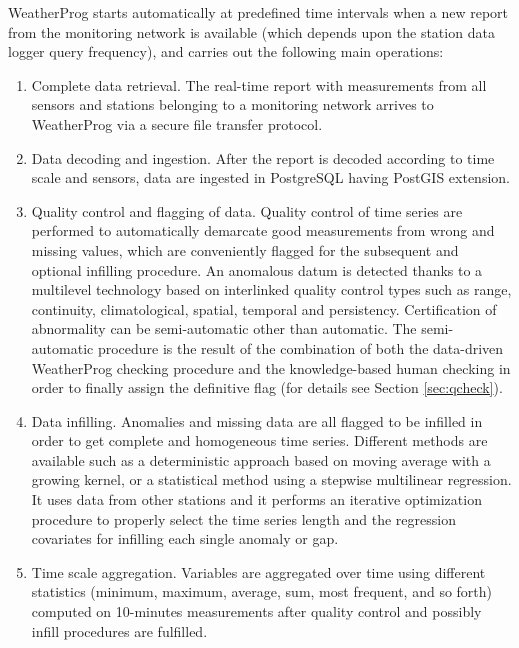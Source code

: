 \documentclass[authoryear,preprint,review,12pt]{elsarticle}
\begin{document}
WeatherProg starts automatically at predefined time intervals when a new report from the monitoring network is available (which depends upon the station data logger query frequency), and carries out the following main operations:
\begin{enumerate}
    \item Complete data retrieval. The real-time report with measurements from all sensors and stations belonging to a monitoring network arrives to WeatherProg via a secure file transfer protocol.
    
    \item Data decoding and ingestion. After the report is decoded according to time scale and sensors, data are ingested in PostgreSQL having PostGIS extension.

    \item Quality control and flagging of data. Quality control of time series are performed to automatically demarcate good measurements from wrong and missing values, which are conveniently flagged for the subsequent and optional infilling procedure.
    An anomalous datum is detected thanks to a multilevel technology based on interlinked quality control types such as range, continuity, climatological, spatial, temporal and persistency.
    Certification of abnormality can be semi-automatic other than automatic.
    The semi-automatic procedure is the result of the combination of both the data-driven WeatherProg checking procedure and the knowledge-based human checking in order to finally assign the definitive flag (for details see Section \ref{sec:qcheck}).
    
    \item Data infilling. Anomalies and missing data are all flagged to be %
    infilled in order to get complete and homogeneous time series.
    Different methods are available such as a deterministic approach based on moving average with a growing kernel, or a statistical method using a stepwise multilinear regression.
    It uses data from other stations and it performs an iterative optimization procedure to properly select the time series length and the regression covariates for infilling each single anomaly or gap.
    
    \item Time scale aggregation. Variables are aggregated over time using different statistics (minimum, maximum, average, sum, most frequent, and so forth) computed on 10-minutes measurements after quality control and possibly infill procedures are fulfilled.
    

\end{enumerate}
\end{document}
